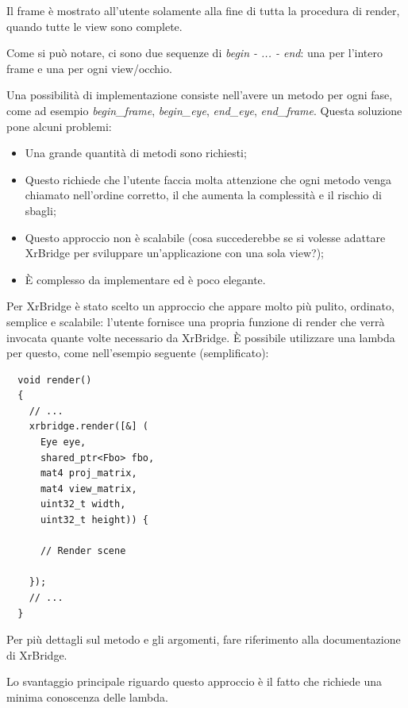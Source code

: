 \documentclass[twoside]{supsistudent}
\begin{document}
Il frame è mostrato all'utente solamente alla fine di tutta la procedura di render, quando tutte le view sono complete.

Come si può notare, ci sono due sequenze di \textit{begin - ... - end}: una per l'intero frame e una per ogni view/occhio.

Una possibilità di implementazione consiste nell'avere un metodo per ogni fase, come ad esempio \textit{begin\_frame}, \textit{begin\_eye}, \textit{end\_eye}, \textit{end\_frame}. Questa soluzione pone alcuni problemi:

\begin{itemize}
  \item Una grande quantità di metodi sono richiesti;
  \item Questo richiede che l'utente faccia molta attenzione che ogni metodo venga chiamato nell'ordine corretto, il che aumenta la complessità e il rischio di sbagli;
  \item Questo approccio non è scalabile (cosa succederebbe se si volesse adattare XrBridge per sviluppare un'applicazione con una sola view?);
  \item È complesso da implementare ed è poco elegante.
\end{itemize}

Per XrBridge è stato scelto un approccio che appare molto più pulito, ordinato, semplice e scalabile: l'utente fornisce una propria funzione di render che verrà invocata quante volte necessario da XrBridge. È possibile utilizzare una lambda per questo, come nell'esempio seguente (semplificato):

\begin{verbatim}
  void render()
  {
    // ...
    xrbridge.render([&] (
      Eye eye,
      shared_ptr<Fbo> fbo,
      mat4 proj_matrix,
      mat4 view_matrix,
      uint32_t width,
      uint32_t height)) {

      // Render scene

    });
    // ...
  }
\end{verbatim}

Per più dettagli sul metodo e gli argomenti, fare riferimento alla documentazione di XrBridge.

Lo svantaggio principale riguardo questo approccio è il fatto che richiede una minima conoscenza delle lambda.
\end{document}
